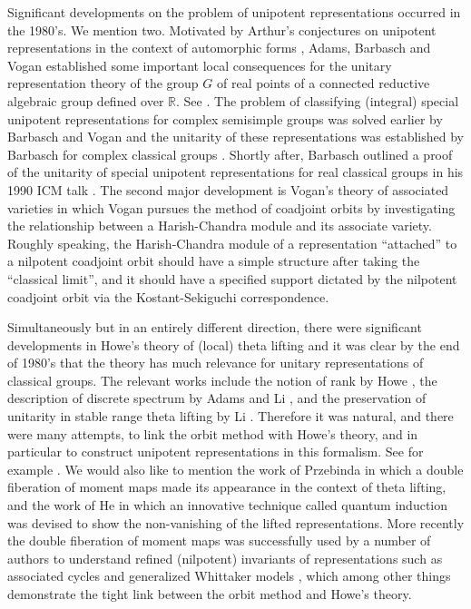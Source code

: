 \documentclass[12pt,a4paper]{amsart}
\newcommand{\R}{\mathbb R}
\numberwithin{equation}{section}
\theoremstyle{remark}
\begin{document}
Significant developments on the problem of unipotent representations occurred in
the 1980's. We mention two. Motivated by Arthur's conjectures on unipotent
representations in the context of automorphic forms \cite{ArPro,ArUni}, Adams,
Barbasch and Vogan established some important local consequences for the unitary
representation theory of the group $G$ of real points of a connected reductive
algebraic group defined over $\R$. See \cite{ABV}. The problem of classifying
(integral) special unipotent representations for complex semisimple groups was
solved earlier by Barbasch and Vogan \cite{BVUni} and the unitarity of these representations
was established by Barbasch for complex classical groups \cite[Section 10]{B.Class}. Shortly after,
Barbasch outlined a proof of the unitarity of special unipotent
representations for real classical groups in his 1990 ICM talk \cite{B.Uni}. The
second major development is Vogan's theory of associated varieties \cite{Vo89}
in which Vogan pursues the method of coadjoint orbits by investigating the
relationship between a Harish-Chandra module and its associate variety. Roughly
speaking, the Harish-Chandra module of a representation ``attached'' to a nilpotent
coadjoint orbit should have a simple structure after taking the ``classical
limit'', and it should have a specified support dictated by the nilpotent
coadjoint orbit via the Kostant-Sekiguchi correspondence.

Simultaneously but in an entirely different direction, there were significant
developments in Howe's theory of (local) theta lifting and it was clear by the
end of 1980's that the theory has much relevance for unitary representations of
classical groups. The relevant works include the notion of rank by Howe
\cite{HoweRank}, the description of discrete spectrum by Adams \cite{Ad83} and Li \cite{Li90},
and the preservation of unitarity in stable range theta lifting by Li \cite{Li89}.
Therefore it was natural, and there were many attempts, to link the orbit method
with Howe's theory, and in particular to construct unipotent representations in
this formalism. See for example \cite{Sa,Pz,HZ,HL,Br,He,Tr,PT,B17}. We would also like
to mention the work of Przebinda \cite{Pz} in which a double
fiberation of moment maps made its appearance in the context of theta lifting,
and the work of He \cite{He} in which an innovative technique called quantum
induction was devised to show the non-vanishing of the lifted representations.
More recently the double fiberation of moment maps was successfully used by a
number of authors to understand refined (nilpotent) invariants of
representations such as associated cycles and generalized Whittaker models
\cite{NOTYK, NZ, GZ, LM}, which among other things demonstrate the tight link
between the orbit method and Howe's theory.
\end{document}
